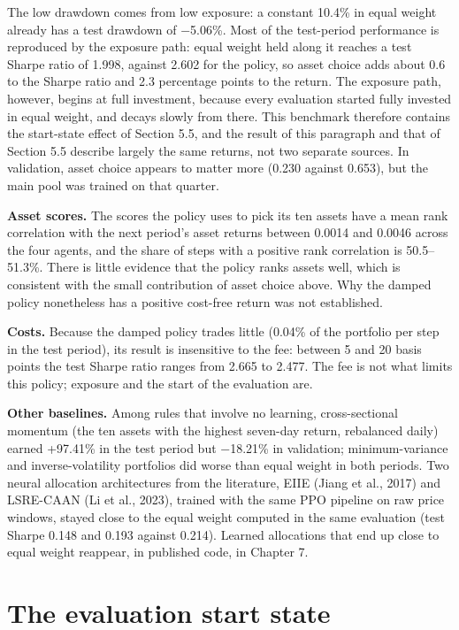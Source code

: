 \documentclass[12pt,a4paper]{report}
\newcounter{none} %
\begin{document}
The low drawdown comes from low exposure: a constant 10.4\% in equal
weight already has a test drawdown of −5.06\%. Most of the test-period
performance is reproduced by the exposure path: equal weight held along
it reaches a test Sharpe ratio of 1.998, against 2.602 for the policy,
so asset choice adds about 0.6 to the Sharpe ratio and 2.3 percentage
points to the return. The exposure path, however, begins at full
investment, because every evaluation started fully invested in equal
weight, and decays slowly from there. This benchmark therefore contains
the start-state effect of Section 5.5, and the result of this paragraph
and that of Section 5.5 describe largely the same returns, not two
separate sources. In validation, asset choice appears to matter more
(0.230 against 0.653), but the main pool was trained on that quarter.

\textbf{Asset scores.} The scores the policy uses to pick its ten assets
have a mean rank correlation with the next period's asset returns
between 0.0014 and 0.0046 across the four agents, and the share of steps
with a positive rank correlation is 50.5--51.3\%. There is little
evidence that the policy ranks assets well, which is consistent with the
small contribution of asset choice above. Why the damped policy
nonetheless has a positive cost-free return was not established.

\textbf{Costs.} Because the damped policy trades little (0.04\% of the
portfolio per step in the test period), its result is insensitive to the
fee: between 5 and 20 basis points the test Sharpe ratio ranges from
2.665 to 2.477. The fee is not what limits this policy; exposure and the
start of the evaluation are.

\textbf{Other baselines.} Among rules that involve no learning,
cross-sectional momentum (the ten assets with the highest seven-day
return, rebalanced daily) earned +97.41\% in the test period but
−18.21\% in validation; minimum-variance and inverse-volatility
portfolios did worse than equal weight in both periods. Two neural
allocation architectures from the literature, EIIE (Jiang et al., 2017)
and LSRE-CAAN (Li et al., 2023), trained with the same PPO pipeline on
raw price windows, stayed close to the equal weight computed in the same
evaluation (test Sharpe 0.148 and 0.193 against 0.214). Learned
allocations that end up close to equal weight reappear, in published
code, in Chapter 7.

\section{The evaluation start state}\label{the-evaluation-start-state}
\end{document}
